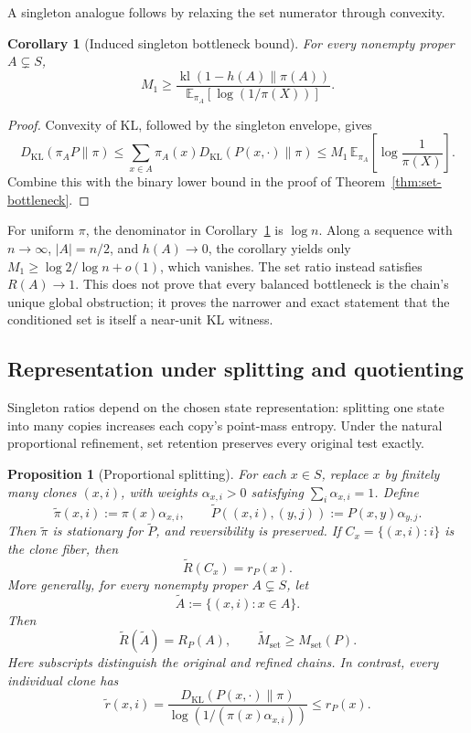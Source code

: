 \documentclass[11pt]{article}
\newtheorem{proposition}[theorem]{Proposition}
\newtheorem{corollary}[theorem]{Corollary}
\newcommand{\KL}{D_{\mathrm{KL}}}
\newcommand{\Mone}{M_1}
\newcommand{\E}{\mathbb{E}}
\newcommand{\kl}{\operatorname{kl}}
\begin{document}
A singleton analogue follows by relaxing the set numerator through
convexity.

\begin{corollary}[Induced singleton bottleneck bound]
\label{cor:singleton-bottleneck}
For every nonempty proper \(A\subsetneq S\),
\[
  \Mone
  \ge
  \frac{\kl(1-h(A)\|\pi(A))}
       {\E_{\pi_A}[\log(1/\pi(X))]}.
\]
\end{corollary}

\begin{proof}
Convexity of KL, followed by the singleton envelope, gives
\[
  \KL(\pi_AP\|\pi)
  \le\sum_{x\in A}\pi_A(x)\KL(P(x,\cdot)\|\pi)
  \le\Mone\,\E_{\pi_A}\!\left[\log\frac1{\pi(X)}\right].
\]
Combine this with the binary lower bound in the proof of
Theorem~\ref{thm:set-bottleneck}.
\end{proof}

For uniform \(\pi\), the denominator in
Corollary~\ref{cor:singleton-bottleneck} is \(\log n\).  Along a sequence
with \(n\to\infty\), \(|A|=n/2\), and \(h(A)\to0\), the corollary yields only
\(\Mone\ge\log2/\log n+o(1)\), which vanishes.  The set ratio instead
satisfies \(R(A)\to1\).  This does not prove that every balanced bottleneck
is the chain's unique global obstruction; it proves the narrower and exact
statement that the conditioned set is itself a near-unit KL witness.

\subsection{Representation under splitting and quotienting}

Singleton ratios depend on the chosen state representation: splitting one
state into many copies increases each copy's point-mass entropy.  Under the
natural proportional refinement, set retention preserves every original
test exactly.

\begin{proposition}[Proportional splitting]
\label{prop:splitting}
For each \(x\in S\), replace \(x\) by finitely many clones
\((x,i)\), with weights \(\alpha_{x,i}>0\) satisfying
\(\sum_i\alpha_{x,i}=1\).  Define
\[
  \widetilde\pi(x,i):=\pi(x)\alpha_{x,i},
  \qquad
  \widetilde P((x,i),(y,j))
  :=P(x,y)\alpha_{y,j}.
\]
Then \(\widetilde\pi\) is stationary for \(\widetilde P\), and
reversibility is preserved.  If
\(C_x=\{(x,i):i\}\) is the clone fiber, then
\[
  \widetilde R(C_x)=r_P(x).
\]
More generally, for every nonempty proper \(A\subsetneq S\), let
\[
  \widetilde A:=\{(x,i):x\in A\}.
\]
Then
\[
  \widetilde R(\widetilde A)=R_P(A),
  \qquad
  \widetilde M_{\mathrm{set}}\ge M_{\mathrm{set}}(P).
\]
Here subscripts distinguish the original and refined chains.  In contrast,
every individual clone has
\[
  \widetilde r(x,i)
  =
  \frac{\KL(P(x,\cdot)\|\pi)}
       {\log(1/(\pi(x)\alpha_{x,i}))}
  \le r_P(x).
\]
\end{proposition}
\end{document}
